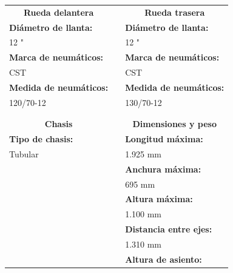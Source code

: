 \begin{table}[H]
\begin{tabular}{lll}
\multicolumn{1}{c}{\textbf{Rueda delantera}} &  & \multicolumn{1}{c}{\textbf{Rueda trasera}}      \\ \cline{1-1} \cline{3-3} 
\textbf{Diámetro de llanta:}                 &  & \textbf{Diámetro de llanta:}                    \\
12 "                                         &  & 12 "                                            \\
\textbf{Marca de neumáticos:}                &  & \textbf{Marca de neumáticos:}                   \\
CST                                          &  & CST                                             \\
\textbf{Medida de neumáticos:}               &  & \textbf{Medida de neumáticos:}                  \\
120/70-12                                    &  & 130/70-12                                       \\
\textbf{}                                    &  &                                                 \\
\textbf{}                                    &  & \textbf{}                                       \\
\multicolumn{1}{c}{\textbf{Chasis}}          &  & \multicolumn{1}{c}{\textbf{Dimensiones y peso}} \\ \cline{1-1} \cline{3-3} 
\textbf{Tipo de chasis:}                     &  & \textbf{Longitud máxima:}                       \\
Tubular                                      &  & 1.925 mm                                        \\
                                             &  & \textbf{Anchura máxima:}                        \\
\textbf{}                                    &  & 695 mm                                          \\
\textbf{}                                    &  & \textbf{Altura máxima:}                         \\
\textbf{}                                    &  & 1.100 mm                                        \\
\textbf{}                                    &  & \textbf{Distancia entre ejes:}                  \\
\textbf{}                                    &  & 1.310 mm                                        \\
\textbf{}                                    &  & \textbf{Altura de asiento:}                     \\

\end{tabular}
\end{table}
